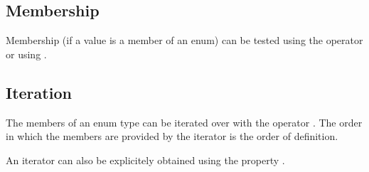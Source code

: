 \documentclass[letterpaper,10pt,english]{sphinxmanual}
\begin{document}
\subsection{Membership}
\label{\detokenize{enums:membership}}
\sphinxAtStartPar
Membership (if a value is a member of an enum) can be tested using the
operator  or using .
\def\sphinxLiteralBlockLabel{\label{\detokenize{enums:id4}}}
\begin{sphinxVerbatim}[commandchars=\\\{\}]
   
  

  

    
\end{sphinxVerbatim}


\subsection{Iteration}
\label{\detokenize{enums:iteration}}
\sphinxAtStartPar
The members of an enum type can be iterated over with the operator
. The order in which the members are provided by the iterator is
the order of definition.
\def\sphinxLiteralBlockLabel{\label{\detokenize{enums:id5}}}
\begin{sphinxVerbatim}[commandchars=\\\{\}]
  \PYG{p}{[}\PYG{p}{]}

   

   \PYG{p}{[}   \PYG{p}{]}
\end{sphinxVerbatim}

\sphinxAtStartPar
An iterator can also be explicitely obtained using the property
.
\def\sphinxLiteralBlockLabel{\label{\detokenize{enums:id6}}}
\begin{sphinxVerbatim}[commandchars=\\\{\}]
  \PYG{p}{[}\PYG{p}{]}

   

   \PYG{p}{[}   \PYG{p}{]}
\end{sphinxVerbatim}
\end{document}
